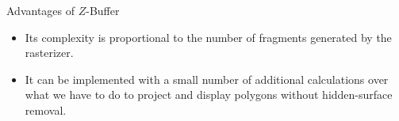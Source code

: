 \documentclass[../COS3712_Notes.tex]{subfiles}
\begin{document}
      \begin{sidenote}{Advantages of $Z$-Buffer}
        $ $\vspace{-1em}
        \begin{itemize}
          \item Its complexity is proportional to the number of fragments generated
            by the rasterizer.
          \item It can be implemented with a small number of additional calculations
            over what we have to do to project and display polygons without
            hidden-surface removal.
        \end{itemize}
      \end{sidenote}
\end{document}
